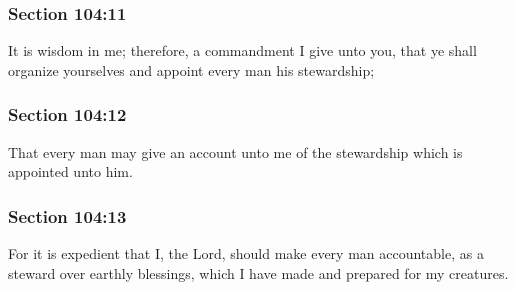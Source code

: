 	\subsubsection{Section 104:11} %
		\label{DC104-11}

		It is wisdom in me; therefore, a commandment I give unto you, that ye shall organize yourselves and appoint every man his stewardship;


	\subsubsection{Section 104:12} %
		\label{DC104-12}

		That every man may give an account unto me of the stewardship which is appointed unto him.


	\subsubsection{Section 104:13} %
		\label{DC104-13}

		For it is expedient that I, the Lord, should make every man accountable, as a steward over earthly blessings, which I have made and prepared for my creatures.


